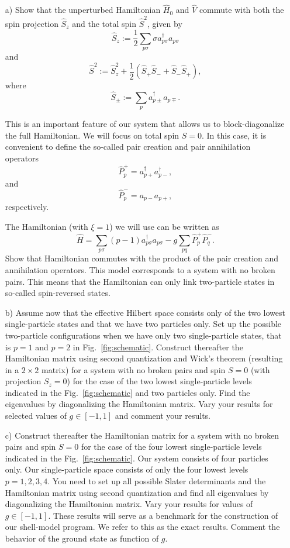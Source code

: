 \documentclass[prc]{revtex4}
\begin{document}
\begin{enumerate}
\item[a)] Show that the  
unperturbed Hamiltonian  $\hat{H}_0$ and $\hat{V}$ commute
with both the spin projection $\hat{S}_z$ and the total spin
$\hat{S}^2$, given by
\[
  \hat{S}_z := \frac{1}{2}\sum_{p\sigma} \sigma a^\dag_{p\sigma}a_{p\sigma}
\]
and
\[
  \hat{S}^2 := \hat{S}_z^2 + \frac{1}{2}(\hat{S}_+\hat{S}_- +
  \hat{S}_-\hat{S}_+),
\]
where
\[
  \hat{S}_\pm := \sum_{p} a^\dag_{p\pm} a_{p\mp}.
\]

This is an important feature of our system that allows us to block-diagonalize
the full Hamiltonian. We will focus on total spin $S=0$.
In this case, it is convenient to define the so-called pair creation and pair
annihilation operators
\[
\hat{P}^{+}_p = a^\dag_{p+}a^\dag_{p-},
\]
and
\[
\hat{P}^{-}_p = a_{p-}a_{p+},
\] 
respectively.

The Hamiltonian (with $\xi=1$) we will use can be written as
\[
\hat{H}=\sum_{p\sigma}(p-1)a_{p\sigma}^{\dagger}a_{p\sigma}
-g\sum_{pq}\hat{P}^{+}_p\hat{P}^{-}_q.
\]
Show  that Hamiltonian commutes with the product of the pair creation and annihilation operators.
This model corresponds to a system with no broken pairs. This means that the Hamiltonian can only link two-particle states in so-called spin-reversed states. 


\item[b)] 
Assume now that the effective Hilbert space consists only of the two lowest single-particle states and that we have two particles only.
Set up the possible two-particle configurations when we have only two single-particle states, that is $p=1$ and $p=2$ in  
Fig.~\ref{fig:schematic}. 
Construct thereafter the Hamiltonian matrix using second quantization and Wick's theorem (resulting in a $2\times 2$ matrix) 
for a system with no broken pairs and spin $S=0$ (with projection $S_z=0$) for the case of the two lowest single-particle levels  
indicated in the Fig.~\ref{fig:schematic} and two particles only. 
Find the eigenvalues by diagonalizing the Hamiltonian matrix.
Vary your results for selected values of $g\in [-1,1]$ and comment your results.

\item[c)] Construct thereafter the Hamiltonian matrix for a system with no broken pairs and spin $S=0$ for the case of the four lowest single-particle levels  
indicated in the Fig.~\ref{fig:schematic}. Our system consists of four particles only.
Our single-particle space consists of only the four lowest levels 
$p=1,2,3,4$.  You need to set up all possible Slater determinants and the Hamiltonian matrix using second quantization and
find all eigenvalues by diagonalizing the Hamiltonian matrix.
Vary your results for values of $g\in [-1,1]$. 
These results will serve as a benchmark for the construction  of our shell-model program. 
We  refer to this as the exact results. Comment the behavior of the ground state as function of $g$. 


\end{enumerate}
\end{document}
